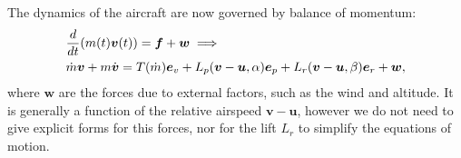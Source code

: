 \documentclass{article}
\renewcommand{\vec}[1]{\boldsymbol{#1}}
\begin{document}
The dynamics of the aircraft are now governed by balance of momentum:
\begin{align}
   \notag & \frac{d}{dt} (m(t) \vec{v}(t)) = \vec{f} + \vec{w} \implies
\\ \label{eqns:motion-vector}
    & \dot{m}\vec{v} + m \dot{\vec{v}} = T(\dot{m}) \vec{e}_v + {L_p}(\vec v - \vec u, \alpha) \vec{e}_p  + {L_r}(\vec v - \vec u,\beta) \vec{e}_r + \vec w,
\end{align}
where $\vec w$ are the forces due to external factors, such as the wind and altitude. It is generally a function of the relative airspeed $\vec v - \vec u$, however we do not need to give explicit forms for this forces, nor for the lift $L_r$ to simplify the equations of motion. 
\end{document}
